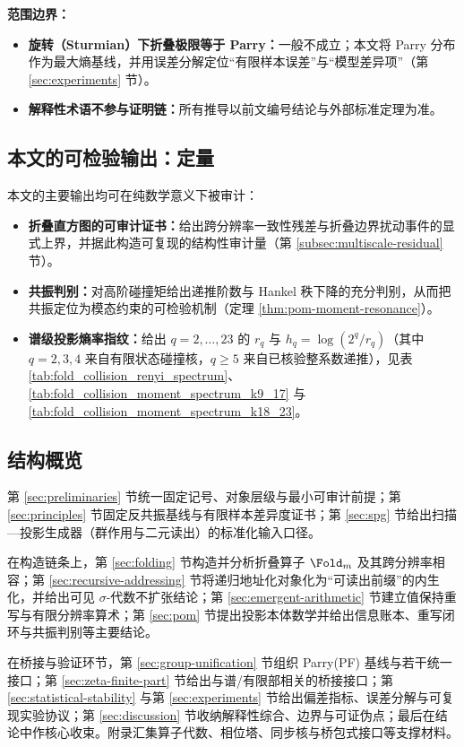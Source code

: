 \textbf{范围边界：}
\begin{itemize}
  \item \textbf{旋转（Sturmian）下折叠极限等于 Parry：}一般不成立；本文将 Parry 分布作为最大熵基线，并用误差分解定位“有限样本误差”与“模型差异项”（第 \ref{sec:experiments} 节）。
  \item \textbf{解释性术语不参与证明链：}所有推导以前文编号结论与外部标准定理为准。
\end{itemize}

\subsection{本文的可检验输出：定量}
本文的主要输出均可在纯数学意义下被审计：
\begin{itemize}
  \item \textbf{折叠直方图的可审计证书：}给出跨分辨率一致性残差与折叠边界扰动事件的显式上界，并据此构造可复现的结构性审计量（第 \ref{subsec:multiscale-residual} 节）。
  \item \textbf{共振判别：}对高阶碰撞矩给出递推阶数与 Hankel 秩下降的充分判别，从而把共振定位为模态约束的可检验机制（定理 \ref{thm:pom-moment-resonance}）。
  \item \textbf{谱级投影熵率指纹：}给出 \(q=2,\dots,23\) 的 \(r_q\) 与 \(h_q=\log(2^q/r_q)\)（其中 \(q=2,3,4\) 来自有限状态碰撞核，\(q\ge 5\) 来自已核验整系数递推），见表 \ref{tab:fold_collision_renyi_spectrum}、\ref{tab:fold_collision_moment_spectrum_k9_17} 与 \ref{tab:fold_collision_moment_spectrum_k18_23}。
\end{itemize}

\subsection{结构概览}
第 \ref{sec:preliminaries} 节统一固定记号、对象层级与最小可审计前提；第 \ref{sec:principles} 节固定反共振基线与有限样本差异度证书；第 \ref{sec:spg} 节给出扫描—投影生成器（群作用与二元读出）的标准化输入口径。\par
在构造链条上，第 \ref{sec:folding} 节构造并分析折叠算子 \(\Fold_m\) 及其跨分辨率相容；第 \ref{sec:recursive-addressing} 节将递归地址化对象化为“可读出前缀”的内生化，并给出可见 \(\sigma\)-代数不扩张结论；第 \ref{sec:emergent-arithmetic} 节建立值保持重写与有限分辨率算术；第 \ref{sec:pom} 节提出投影本体数学并给出信息账本、重写闭环与共振判别等主要结论。\par
在桥接与验证环节，第 \ref{sec:group-unification} 节组织 Parry(PF) 基线与若干统一接口；第 \ref{sec:zeta-finite-part} 节给出与谱/有限部相关的桥接接口；第 \ref{sec:statistical-stability} 与第 \ref{sec:experiments} 节给出偏差指标、误差分解与可复现实验协议；第 \ref{sec:discussion} 节收纳解释性综合、边界与可证伪点；最后在结论中作核心收束。附录汇集算子代数、相位塔、同步核与桥包式接口等支撑材料。
